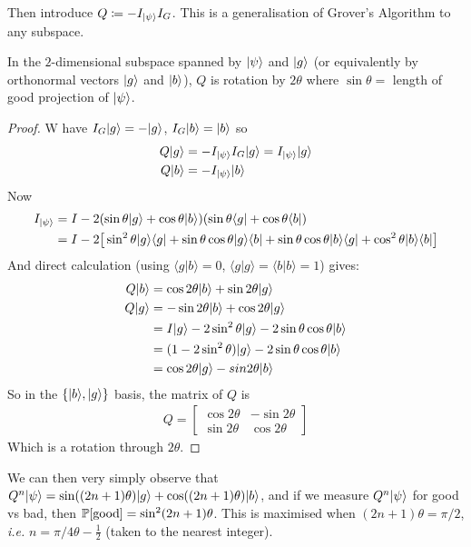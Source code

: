 \documentclass[]{article}
\begin{document}
Then introduce $Q\coloneqq -I_{\ket{\psi}}I_G$. This is a generalisation of Grover's Algorithm to any subspace.

\begin{theorem*}
	In the $2$-dimensional subspace spanned by $\ket{\psi}$ and $\ket{g}$ (or equivalently by orthonormal vectors $\ket{g}$ and $\ket{b}$), $Q$ is rotation by $2\theta$ where $\sin \theta = $ length of good projection of $\ket{\psi}$.
\end{theorem*}

\begin{proof}
	W have $I_G\ket{g} = - \ket{g}$, $I_G\ket{b} = \ket{b}$ so
	\begin{align*}
		Q\ket{g} &= -I_{\ket{\psi}}I_{G}\ket{g} = I_{\ket{\psi}}\ket{g}\\
		Q\ket{b} &= -I_{\ket{\psi}}\ket{b}
	\end{align*}
	Now
	\begin{align*}
		I_{\ket{\psi}} &= I - 2(\sin\theta\ket{g} + \cos\theta\ket{b})(\sin\theta\bra{g} + \cos\theta\bra{b})\\
		&= I - 2\big[\sin^2\theta \ket{g}\bra{g} + \sin\theta\cos\theta\ket{g}\bra{b}+\sin\theta\cos\theta\ket{b}\bra{g}+\cos^2\theta\ket{b}\bra{b}\big]
	\end{align*}
	And direct calculation (using $\langle g | b \rangle = 0$, $\langle g | g\rangle = \langle b | b \rangle = 1$) gives:
	\begin{align*}
		Q\ket{b} &= \cos2\theta\ket{b} + \sin2\theta \ket{g}\\
		Q\ket{g} &= -\sin2\theta \ket{b} + \cos2\theta \ket{g}\\
		&= I\ket{g} - 2\sin^2\theta\ket{g} - 2\sin\theta\cos\theta \ket{b}\\
		&= (1-2\sin^2\theta)\ket{g} - 2\sin\theta\cos\theta\ket{b}\\
		&= \cos2\theta \ket{g} - sin2\theta \ket{b}
	\end{align*}
	So in the $\{\ket{b},\ket{g}\}$ basis, the matrix of $Q$ is
	\begin{align*}
		Q = \left[\begin{array}{cc} \cos2\theta & -\sin2\theta \\ \sin2\theta & \cos 2\theta \end{array}\right]
	\end{align*}
	Which is a rotation through $2\theta$.
\end{proof}

We can then very simply observe that $Q^n\ket{\psi} = \sin((2n+1)\theta)\ket{g} + \cos((2n+1)\theta)\ket{b}$, and if we measure $Q^n\ket{\psi}$ for good vs bad, then $\P[\textrm{good}] = \sin^2(2n+1)\theta$. This is maximised when $(2n+1)\theta = \pi/2$, \textit{i.e.} $n = \pi/4\theta - \frac{1}{2}$ (taken to the nearest integer).
\end{document}
